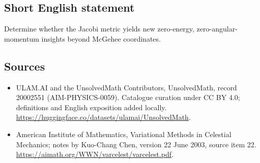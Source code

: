 \documentclass[11pt]{article}
\begin{document}
\subsection{Short English statement}
Determine whether the Jacobi metric yields new zero-energy, zero-angular-momentum insights beyond McGehee coordinates.
\subsection{Sources}
\begin{itemize}
\item[\hypertarget{source:20002551:1}{S1}] ULAM.AI and the UnsolvedMath Contributors, UnsolvedMath, record 20002551 (AIM-PHYSICS-0059). Catalogue curation under CC BY 4.0; definitions and English exposition added locally.
\url{https://huggingface.co/datasets/ulamai/UnsolvedMath}.
\item[\hypertarget{source:20002551:2}{S2}] American Institute of Mathematics, Variational Methods in Celestial Mechanics; notes by Kuo-Chang Chen, version 22 June 2003, source item 22.
\url{https://aimath.org/WWN/varcelest/varcelest.pdf}.
\end{itemize}
\label{end:20002551}
\end{document}
